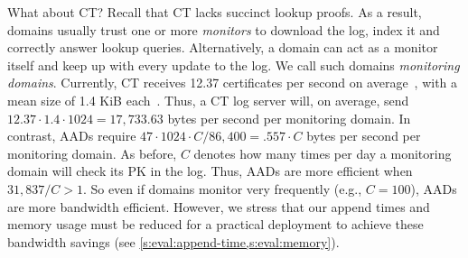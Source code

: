What about CT?
Recall that CT lacks succinct lookup proofs.
As a result, domains usually trust one or more \textit{monitors} to download the log, index it and correctly answer lookup queries.
Alternatively, a domain can act as a monitor itself and keep up with every update to the log.
We call such domains \emph{monitoring domains}.
Currently, CT receives 12.37 certificates per second on average~\cite{ct-num-certs}, with a mean size of 1.4 KiB each~\cite{ct-avg-cert-size}.
Thus, a CT log server will, on average, send $12.37 \cdot 1.4 \cdot 1024 = 17,733.63$ bytes per second per monitoring domain.
In contrast, AADs require $47 \cdot 1024 \cdot C / 86,400 = .557\cdot C$ bytes per second per monitoring domain.
As before, $C$ denotes how many times per day a monitoring domain will check its PK in the log.
Thus, AADs are more efficient when $31,837 / C > 1$.
So even if domains monitor very frequently (e.g., $C = 100$), AADs are more bandwidth efficient.
However, we stress that our append times and memory usage must be reduced for a practical deployment to achieve these bandwidth savings (see \cref{s:eval:append-time,s:eval:memory}).

%

